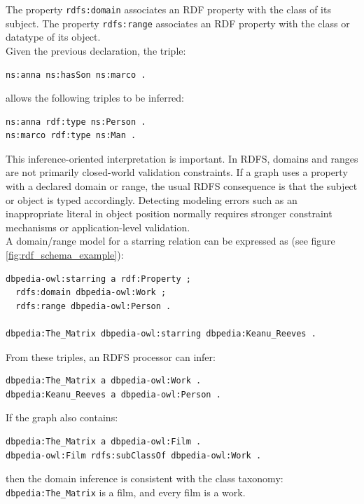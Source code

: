 \documentclass{scrbook}
\begin{document}
	The property \texttt{rdfs:domain} associates an RDF property with the class of its subject. The property \texttt{rdfs:range} associates an RDF property with the class or datatype of its object.\\
	
	Given the previous declaration, the triple:
	
	\begin{lstlisting}
ns:anna ns:hasSon ns:marco .
	\end{lstlisting}
	
	allows the following triples to be inferred:
	
	\begin{lstlisting}
ns:anna rdf:type ns:Person .
ns:marco rdf:type ns:Man .
	\end{lstlisting}
	
	This inference-oriented interpretation is important. In RDFS, domains and ranges are not primarily closed-world validation constraints. If a graph uses a property with a declared domain or range, the usual RDFS consequence is that the subject or object is typed accordingly. Detecting modeling errors such as an inappropriate literal in object position normally requires stronger constraint mechanisms or application-level validation.\\
	
	A domain/range model for a starring relation can be expressed as (see figure \ref{fig:rdf_schema_example}):
	
	\begin{lstlisting}
dbpedia-owl:starring a rdf:Property ;
  rdfs:domain dbpedia-owl:Work ;
  rdfs:range dbpedia-owl:Person .
		
dbpedia:The_Matrix dbpedia-owl:starring dbpedia:Keanu_Reeves .
	\end{lstlisting}
	
	From these triples, an RDFS processor can infer:
	
	\begin{lstlisting}
dbpedia:The_Matrix a dbpedia-owl:Work .
dbpedia:Keanu_Reeves a dbpedia-owl:Person .
	\end{lstlisting}
	
	If the graph also contains:
	
	\begin{lstlisting}
dbpedia:The_Matrix a dbpedia-owl:Film .
dbpedia-owl:Film rdfs:subClassOf dbpedia-owl:Work .
	\end{lstlisting}
	
	then the domain inference is consistent with the class taxonomy: \texttt{dbpedia:The\_Matrix} is a film, and every film is a work.
	
\end{document}
